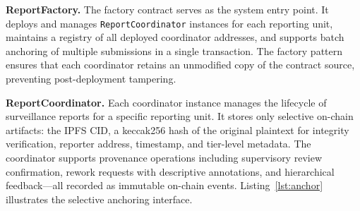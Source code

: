\documentclass[AMA,LATO1COL]{WileyNJD-v2}
\begin{document}
%
%
%
%

\textbf{ReportFactory.} The factory contract serves as the system entry point. It deploys and manages \texttt{ReportCoordinator} instances for each reporting unit, maintains a registry of all deployed coordinator addresses, and supports batch anchoring of multiple submissions in a single transaction. The factory pattern ensures that each coordinator retains an unmodified copy of the contract source, preventing post-deployment tampering.

\textbf{ReportCoordinator.} Each coordinator instance manages the lifecycle of surveillance reports for a specific reporting unit. It stores only selective on-chain artifacts: the IPFS CID, a keccak256 hash of the original plaintext for integrity verification, reporter address, timestamp, and tier-level metadata. The coordinator supports provenance operations including supervisory review confirmation, rework requests with descriptive annotations, and hierarchical feedback---all recorded as immutable on-chain events. Listing~\ref{lst:anchor} illustrates the selective anchoring interface.
\end{document}
